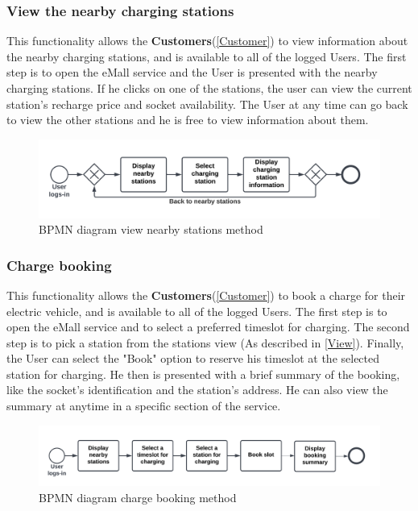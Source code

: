 \subsubsection{View the nearby charging stations}
This functionality allows the \textbf{Customers}(\ref{Customer}) to view information about the nearby charging stations, and is available to all of the logged Users. 
The first step is to open the eMall service and the User is presented with the nearby charging stations. 
If he clicks on one of the stations, the user can view the current station's recharge price and socket availability.
The User at any time can go back to view the other stations and he is free to view information about them.\label{View}
\begin{figure}[H]
    \begin{center}
        \includegraphics[width=\textwidth]{img/fun-view-info.png}
        \caption{BPMN diagram view nearby stations method}
    \end{center}
\end{figure}
\subsubsection{Charge booking}
This functionality allows the \textbf{Customers}(\ref{Customer}) to book a charge for their electric vehicle, and is available to all of the logged Users. 
The first step is to open the eMall service and to select a preferred timeslot for charging. The second step is to pick a station from the stations view (As described in \ref{View}).
Finally, the User can select the "Book" option to reserve his timeslot at the selected station for charging.
He then is presented with a brief summary of the booking, like the socket's identification and the station's address.
He can also view the summary at anytime in a specific section of the service.\label{Book} 
\begin{figure}[H]
    \begin{center}
        \includegraphics[width=\textwidth]{img/fun-book-slot.png}
        \caption{BPMN diagram charge booking method}
    \end{center}
\end{figure}

